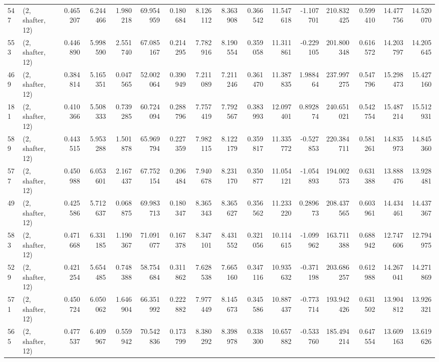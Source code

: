 \begin{tabular}{llrrrrrrrrrrrrrr}
547 &  (2, shafter, 12) &   0.465207 &   6.244466 &   1.980218 &    69.954959 &   0.180684 &   8.126112 &   8.363908 &  0.366542 &  11.547618 &  -1.107701 &   210.832425 &  0.599410 &  14.477756 &  14.520070 \\
553 &  (2, shafter, 12) &   0.446890 &   5.998590 &   2.551740 &    67.085167 &   0.214295 &   7.782916 &   8.190554 &  0.359058 &  11.311861 &  -0.229105 &   201.800348 &  0.616572 &  14.203797 &  14.205645 \\
469 &  (2, shafter, 12) &   0.384814 &   5.165351 &   0.047565 &    52.002064 &   0.390949 &   7.211089 &   7.211246 &  0.361470 &  11.387835 &   1.988464 &   237.997275 &  0.547796 &  15.298473 &  15.427160 \\
181 &  (2, shafter, 12) &   0.410366 &   5.508333 &   0.739285 &    60.724094 &   0.288796 &   7.757419 &   7.792567 &  0.383993 &  12.097401 &   0.892874 &   240.651021 &  0.542754 &  15.487214 &  15.512931 \\
589 &  (2, shafter, 12) &   0.443515 &   5.953288 &   1.501878 &    65.969794 &   0.227359 &   7.982115 &   8.122179 &  0.359817 &  11.335772 &  -0.527853 &   220.384711 &  0.581261 &  14.835973 &  14.845360 \\
577 &  (2, shafter, 12) &   0.450988 &   6.053601 &   2.167437 &    67.752154 &   0.206484 &   7.940678 &   8.231170 &  0.350877 &  11.054121 &  -1.054893 &   194.002573 &  0.631388 &  13.888476 &  13.928481 \\
49  &  (2, shafter, 12) &   0.425586 &   5.712637 &   0.068875 &    69.983713 &   0.180347 &   8.365343 &   8.365627 &  0.356562 &  11.233220 &   0.289673 &   208.437565 &  0.603961 &  14.434461 &  14.437367 \\
583 &  (2, shafter, 12) &   0.471668 &   6.331185 &   1.190367 &    71.091077 &   0.167378 &   8.347101 &   8.431552 &  0.321056 &  10.114615 &  -1.099962 &   163.711388 &  0.688942 &  12.747606 &  12.794975 \\
529 &  (2, shafter, 12) &   0.421254 &   5.654485 &   0.748388 &    58.754684 &   0.311862 &   7.628538 &   7.665160 &  0.347116 &  10.935632 &  -0.371198 &   203.686257 &  0.612988 &  14.267041 &  14.271869 \\
571 &  (2, shafter, 12) &   0.450724 &   6.050062 &   1.646904 &    66.351992 &   0.222882 &   7.977449 &   8.145673 &  0.345586 &  10.887437 &  -0.773714 &   193.942426 &  0.631502 &  13.904812 &  13.926321 \\
565 &  (2, shafter, 12) &   0.477537 &   6.409967 &   0.559942 &    70.542836 &   0.173799 &   8.380292 &   8.398978 &  0.338300 &  10.657882 &  -0.533760 &   185.494214 &  0.647554 &  13.609163 &  13.619626 \\

\end{tabular}
